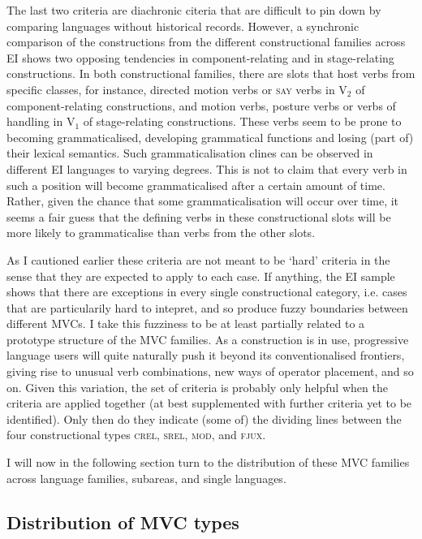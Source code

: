 The last two criteria are diachronic citeria that are difficult to pin down by comparing languages without historical records. However, a synchronic comparison of the constructions from the different constructional families across EI shows two opposing tendencies in component-relating and in stage-relating constructions. In both constructional families, there are slots that host verbs from specific classes, for instance, directed motion verbs or \textsc{say} verbs in V$_2$ of component-relating constructions, and motion verbs, posture verbs or verbs of handling in V$_1$ of stage-relating constructions. These verbs seem to be prone to becoming grammaticalised, developing grammatical functions and losing (part of) their lexical semantics. Such grammaticalisation clines can be observed in different EI languages to varying degrees. This is not to claim that every verb in such a position will become grammaticalised after a certain amount of time. Rather, given the chance that some grammaticalisation will occur over time, it seems a fair guess that the defining verbs in these constructional slots will be more likely to grammaticalise than verbs from the other slots.

As I cautioned earlier these criteria are not meant to be `hard' criteria in the sense that they are expected to apply to each case. If anything, the EI sample shows that there are exceptions in every single constructional category, i.e. cases that are particularily hard to intepret, and so produce fuzzy boundaries between different MVCs. I take this fuzziness to be at least partially related to a prototype structure of the MVC families. As a construction is in use, progressive language users will quite naturally push it beyond its conventionalised frontiers, giving rise to unusual verb combinations, new ways of operator placement, and so on. Given this variation, the set of criteria is probably only helpful when the criteria are applied together (at best supplemented with further criteria yet to be identified). Only then do they indicate (some of) the dividing lines between the four constructional types \textsc{crel}, \textsc{srel}, \textsc{mod}, and \textsc{fjux}. 

I will now in the following section turn to the distribution of these MVC families across language families, subareas, and single languages.

\subsection{Distribution of MVC types}\label{sec:dist_types}

